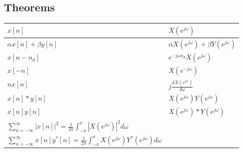 \documentclass{article}
\begin{document}
\subsection*{Theorems}
\begin{center}
    \begin{tabularx}{\textwidth}{XX}
        \hline
        $x[n]$ & $X(e^{j\omega})$\\
        \hline
        $\alpha x[n]+\beta y[n]$ & $\alpha X(e^{j\omega}) + \beta Y(e^{j\omega})$\\
        $x[n-n_d]$ & $e^{-j\omega n_d}X(e^{j\omega})$\\
        $x[-n]$ & $X(e^{-j\omega})$\\
        $nx[n]$ & $j\frac{dX(e^{j\omega})}{d\omega}$\\
        $x[n] * y[n]$ & $X(e^{j\omega})Y(e^{j\omega})$\\
        $x[n]y[n]$ & $X(e^{j\omega}) * Y(e^{j\omega})$\\
        $\sum_{n=-\infty}^{\infty}{|x[n]|^2}=\frac{1}{2\pi}\int_{-\pi}^{\pi}{|X(e^{j\omega})|^2d\omega}$ & \\
        $\sum_{n=-\infty}^{\infty}{x[n]y^*[n]}=\frac{1}{2\pi}\int_{-\pi}^{\pi}{X(e^{j\omega})Y^*(e^{j\omega})d\omega}$ &\\
    \end{tabularx}
\end{center}
\end{document}
